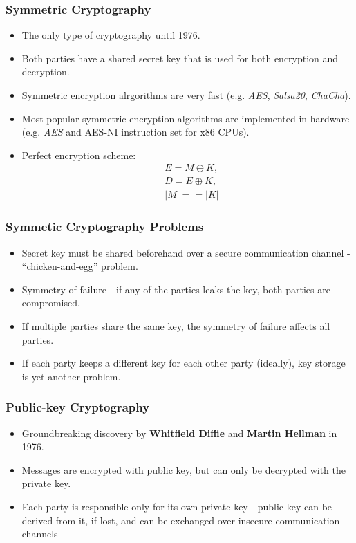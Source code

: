\documentclass{beamer}
\begin{document}
\begin{frame}
  \frametitle{Symmetric Cryptography}
  \begin{itemize}
  \item The only type of cryptography until 1976.
  \item Both parties have a shared secret key that is used for both encryption
    and decryption.
  \item Symmetric encryption alrgorithms are very fast (e.g. \textit{AES},
    \textit{Salsa20}, \textit{ChaCha}).
  \item Most popular symmetric encryption algorithms are implemented in hardware
    (e.g. \textit{AES} and AES-NI instruction set for x86 CPUs).
  \item Perfect encryption scheme:
    \begin{align*}
      &E = M \oplus K, \\
      &D = E \oplus K, \\
      &|M| == |K|
    \end{align*}
  \end{itemize}
\end{frame}

\begin{frame}
  \frametitle{Symmetic Cryptography Problems}
  \begin{itemize}
  \item Secret key must be shared beforehand over a secure communication channel
    - ``chicken-and-egg'' problem.
  \item Symmetry of failure - if any of the parties leaks the key, both parties
    are compromised.    
  \item If multiple parties share the same key, the symmetry of failure affects
    all parties.  
  \item If each party keeps a different key for each other party (ideally), key
    storage is yet another problem.
  \end{itemize}
\end{frame}

\begin{frame}
  \frametitle{Public-key Cryptography}
  \begin{itemize}
  \item Groundbreaking discovery by \textbf{Whitfield Diffie} and \textbf{Martin
      Hellman} in 1976.
  \item Messages are encrypted with public key, but can only be decrypted with
    the private key.
  \item Each party is responsible only for its own private key - public key can
    be derived from it, if lost, and can be exchanged over insecure
    communication channels
  \end{itemize}
\end{frame}
\end{document}
